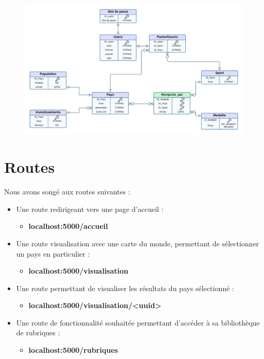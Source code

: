 \documentclass[12pt]{article}
\begin{document}
	\begin{center}
		\begin{figure}[H]
			\includegraphics[scale=0.25]{modele01.jpeg}
		\end{figure}
	\end{center}

	\section{Routes}
	
	Nous avons songé aux routes suivantes :
	
	\begin{itemize}
		\item Une route redirigeant vers une page d'accueil :
		\begin{itemize}
			\item \textbf{localhost:5000/accueil}
		\end{itemize}
		\item Une route visualisation avec une carte du monde, permettant de sélectionner un pays en particulier :
		\begin{itemize}
			\item \textbf{localhost:5000/visualisation}
		\end{itemize}
		\item Une route permettant de visualiser les résultats du pays sélectionné :
		\begin{itemize}
			\item \textbf{localhost:5000/visualisation/<uuid>}
		\end{itemize}
		\item Une route de fonctionnalité souhaitée permettant d'accéder à sa bibliothèque de rubriques :
		\begin{itemize}
			\item \textbf{localhost:5000/rubriques}
		\end{itemize}
	\end{itemize}
\end{document}
